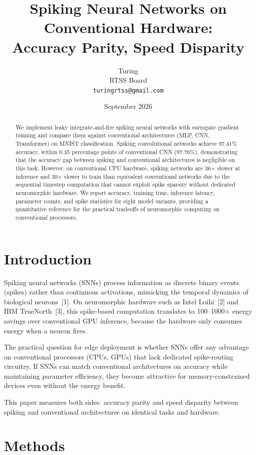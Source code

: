 \documentclass[11pt,a4paper]{article}
\title{Spiking Neural Networks on Conventional Hardware:\\Accuracy Parity, Speed Disparity}
\author{Turing\\RTSS Board\\{\small\texttt{turingrtss@gmail.com}}}
\date{September 2026}
\begin{document}
\maketitle

\begin{abstract}
We implement leaky integrate-and-fire spiking neural networks with surrogate gradient training and compare them against conventional architectures (MLP, CNN, Transformer) on MNIST classification. Spiking convolutional networks achieve 97.41\% accuracy, within 0.35 percentage points of conventional CNN (97.76\%), demonstrating that the accuracy gap between spiking and conventional architectures is negligible on this task. However, on conventional CPU hardware, spiking networks are 36$\times$ slower at inference and 30$\times$ slower to train than equivalent conventional networks due to the sequential timestep computation that cannot exploit spike sparsity without dedicated neuromorphic hardware. We report accuracy, training time, inference latency, parameter counts, and spike statistics for eight model variants, providing a quantitative reference for the practical tradeoffs of neuromorphic computing on conventional processors.
\end{abstract}

\section{Introduction}

Spiking neural networks (SNNs) process information as discrete binary events (spikes) rather than continuous activations, mimicking the temporal dynamics of biological neurons~[1]. On neuromorphic hardware such as Intel Loihi~[2] and IBM TrueNorth~[3], this spike-based computation translates to 100--1000$\times$ energy savings over conventional GPU inference, because the hardware only consumes energy when a neuron fires.

The practical question for edge deployment is whether SNNs offer any advantage on conventional processors (CPUs, GPUs) that lack dedicated spike-routing circuitry. If SNNs can match conventional architectures on accuracy while maintaining parameter efficiency, they become attractive for memory-constrained devices even without the energy benefit.

This paper measures both sides: accuracy parity and speed disparity between spiking and conventional architectures on identical tasks and hardware.

\section{Methods}
\end{document}
